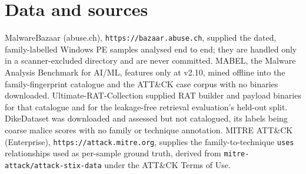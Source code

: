 \section*{Data and sources}
\label{sec:references}

MalwareBazaar (abuse.ch), \texttt{https://bazaar.abuse.ch}, supplied the dated, family-labelled
Windows PE samples analysed end to end; they are handled only in a scanner-excluded directory and
are never committed. MABEL, the Malware Analysis Benchmark for AI/ML, features only at v2.10, mined
offline into the family-fingerprint catalogue and the ATT\&CK case corpus with no binaries
downloaded. Ultimate-RAT-Collection supplied RAT builder and payload binaries for that catalogue and
for the leakage-free retrieval evaluation's held-out split. DikeDataset was downloaded and assessed
but not catalogued, its labels being coarse malice scores with no family or technique annotation.
MITRE ATT\&CK (Enterprise), \texttt{https://attack.mitre.org}, supplies the family-to-technique
\texttt{uses} relationships used as per-sample ground truth, derived from
\texttt{mitre-attack/attack-stix-data} under the ATT\&CK Terms of Use.

